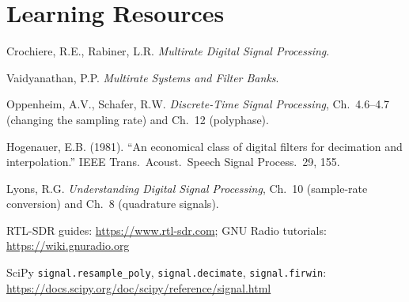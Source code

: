 \documentclass[11pt,a4paper]{article}
\begin{document}
\section*{Learning Resources}
\begin{resources}
  \item Crochiere, R.E., Rabiner, L.R. \emph{Multirate Digital Signal Processing}.
  \item Vaidyanathan, P.P. \emph{Multirate Systems and Filter Banks}.
  \item Oppenheim, A.V., Schafer, R.W. \emph{Discrete-Time Signal Processing}, Ch.~4.6--4.7 (changing the sampling rate) and Ch.~12 (polyphase).
  \item Hogenauer, E.B. (1981). ``An economical class of digital filters for decimation and interpolation.'' IEEE Trans.\ Acoust.\ Speech Signal Process.\ 29, 155.
\end{resources}
\begin{resources}
  \item Lyons, R.G. \emph{Understanding Digital Signal Processing}, Ch.~10 (sample-rate conversion) and Ch.~8 (quadrature signals).
  \item RTL-SDR guides: \url{https://www.rtl-sdr.com}; GNU Radio tutorials: \url{https://wiki.gnuradio.org}
\end{resources}
\begin{resources}
  \item SciPy \texttt{signal.resample\_poly}, \texttt{signal.decimate}, \texttt{signal.firwin}: \url{https://docs.scipy.org/doc/scipy/reference/signal.html}
\end{resources}

\evaluation
\end{document}
